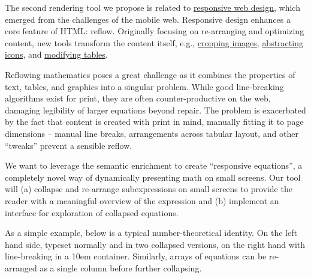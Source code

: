 \documentclass[12pt]{amsart}
\begin{document}
The second rendering tool we propose is related to 
\href{https://en.wikipedia.org/wiki/Responsive_Web_Design}{responsive web 
design}, which emerged from the challenges of the mobile web. Responsive design 
enhances a core feature of HTML: reflow. Originally focusing on re-arranging and 
optimizing content, new tools transform the content itself, e.g., \href{ 
http://www.smashingmagazine.com/2013/07/08/choosing-a-responsive-image- 
solution/}{cropping images}, \href{http://responsiveicons.co.uk}{abstracting 
icons}, and \href{ 
http://zurb.com/playground/projects/responsive-tables/index.html}{ modifying 
tables}.

Reflowing mathematics poses a great challenge as it combines the properties of 
text, tables, and graphics into a singular problem. While good line-breaking 
algorithms exist for print, they are often counter-productive on the web, 
damaging legibility of larger equations beyond repair. The problem is 
exacerbated by the fact that content is created with print in mind, manually 
fitting it to page dimensions -- manual line breaks, arrangements across tabular 
layout, and other ``tweaks'' prevent a sensible reflow.

We want to leverage the semantic enrichment to create ``responsive equations'', 
a completely novel way of dynamically presenting math on small screens. Our 
tool will (a) collapse and re-arrange subexpressions on small screens to provide 
the reader with a meaningful overview of the expression and (b) implement an 
interface for exploration of collapsed equations.

As a simple example, below is a typical number-theoretical identity. On the 
left hand side, typeset normally and in two collapsed versions, on the right 
hand with line-breaking in a 10em container. Similarly, arrays of equations can 
be re-arranged as a single column before further collapsing.
\end{document}
